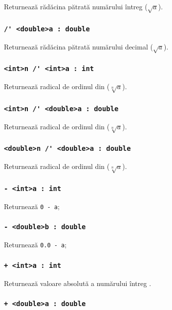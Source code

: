 Returnează rădăcina pătrată numărului întreg  ($\sqrt{a}$).

\subsubsection{\lstinline|/' <double>a : double|}

Returnează rădăcina pătrată numărului decimal  ($\sqrt{a}$).

\subsubsection{\lstinline|<int>n /' <int>a : int|}

Returnează radical de ordinul  din  ($\sqrt[n]{a}$).

\subsubsection{\lstinline|<int>n /' <double>a : double|}

Returnează radical de ordinul  din  ($\sqrt[n]{a}$).

\subsubsection{\lstinline|<double>n /' <double>a : double|}

Returnează radical de ordinul  din  ($\sqrt[n]{a}$).


\subsubsection{\lstinline|- <int>a : int|}

Returnează \lstinline|0 - a|;

\subsubsection{\lstinline|- <double>b : double|}

Returnează \lstinline|0.0 - a|;

\subsubsection{\lstinline|+ <int>a : int|}

Returnează valoare absolută a numărului întreg .

\subsubsection{\lstinline|+ <double>a : double|}

